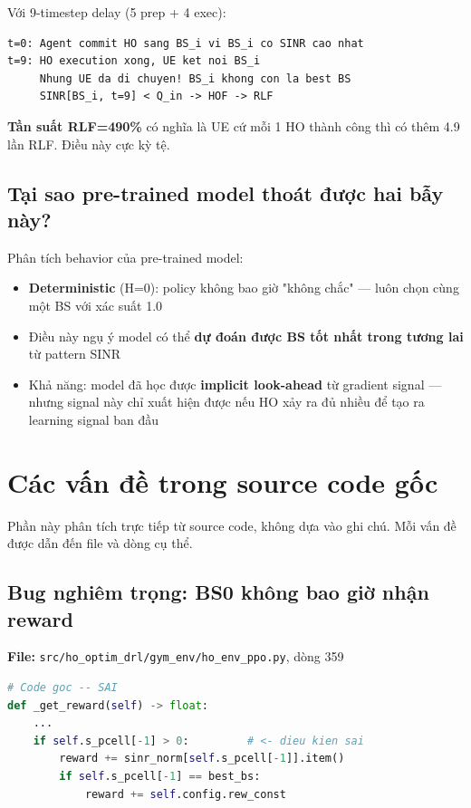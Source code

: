 \documentclass[11pt]{article}
\begin{document}
Với 9-timestep delay (5 prep + 4 exec):

\begin{lstlisting}
t=0: Agent commit HO sang BS_i vi BS_i co SINR cao nhat
t=9: HO execution xong, UE ket noi BS_i
     Nhung UE da di chuyen! BS_i khong con la best BS
     SINR[BS_i, t=9] < Q_in -> HOF -> RLF
\end{lstlisting}

\textbf{Tần suất RLF=490\%} có nghĩa là UE cứ mỗi 1 HO thành công thì có thêm 4.9 lần RLF. Điều này cực kỳ tệ.

\subsection{Tại sao pre-trained model thoát được hai bẫy này?}

Phân tích behavior của pre-trained model:
\begin{itemize}
  \item \textbf{Deterministic} (H=0): policy không bao giờ "không chắc" --- luôn chọn cùng một BS với xác suất 1.0
  \item Điều này ngụ ý model có thể \textbf{dự đoán được BS tốt nhất trong tương lai} từ pattern SINR
  \item Khả năng: model đã học được \textbf{implicit look-ahead} từ gradient signal --- nhưng signal này chỉ xuất hiện được nếu HO xảy ra đủ nhiều để tạo ra learning signal ban đầu
\end{itemize}

\section{Các vấn đề trong source code gốc}

Phần này phân tích trực tiếp từ source code, không dựa vào ghi chú. Mỗi vấn đề được dẫn đến file và dòng cụ thể.

\subsection{Bug nghiêm trọng: BS0 không bao giờ nhận reward}

\textbf{File:} \texttt{src/ho\_optim\_drl/gym\_env/ho\_env\_ppo.py}, dòng 359

\begin{lstlisting}[language=Python]
# Code goc -- SAI
def _get_reward(self) -> float:
    ...
    if self.s_pcell[-1] > 0:         # <- dieu kien sai
        reward += sinr_norm[self.s_pcell[-1]].item()
        if self.s_pcell[-1] == best_bs:
            reward += self.config.rew_const
\end{lstlisting}
\end{document}
